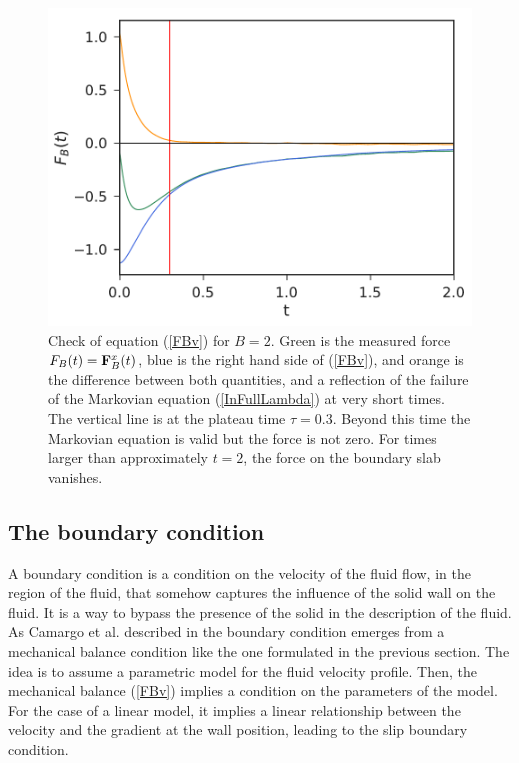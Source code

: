 \documentclass[b5paper,openright,10pt]{book}
\begin{document}
\begin{figure}[]
  \centering
\includegraphics[scale=0.41]{checkMecBalance-17nodes-WALLS}
\caption[Check mechanical balance]{
  Check  of equation  (\ref{FBv}) for  $B=2$. Green  is the  measured force
  $F_B(t)={\bf F}^x_B(t)$, blue is the right hand side of (\ref{FBv}),
  and orange is the difference  between both quantities, and a reflection
  of  the failure  of the  Markovian equation  (\ref{InFullLambda}) at
  very  short  times.  The  vertical  line  is  at  the  plateau  time
  $\tau=0.3$. Beyond this time the Markovian equation is valid but the
  force is  not zero. For  times larger than approximately  $t=2$, the
  force on the boundary slab vanishes.}
\label{Fig.FBcheck}
\end{figure}



\subsection{The boundary condition}
\label{sub:slip}
A boundary condition is a condition on the velocity of the fluid flow,
in the region of the fluid, that somehow captures the influence of the
solid wall  on the fluid. It  is a way  to bypass the presence  of the
solid in the  description of the fluid. As Camargo et al. described  in \cite{CamargoBC2018}
the  boundary condition  emerges from  a mechanical  balance condition
like  the one  formulated in  the previous  section.  The  idea is  to
assume a parametric  model for the fluid velocity  profile.  Then, the
mechanical balance  (\ref{FBv}) implies a condition  on the parameters
of the  model.  For the  case of a linear  model, it implies  a linear
relationship  between  the  velocity  and the  gradient  at  the  wall
position,  leading to  the slip  boundary condition.  
\end{document}
